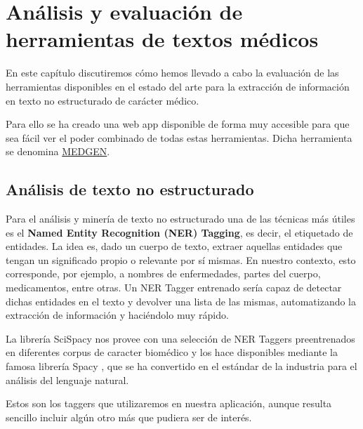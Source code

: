 \chapter{Análisis y evaluación de \\herramientas de textos médicos}

En este capítulo discutiremos cómo hemos llevado a cabo la evaluación de las herramientas disponibles en el estado del arte para la extracción de información en texto no estructurado de carácter médico.

Para ello se ha creado una web app disponible de forma muy accesible para que sea fácil ver el poder combinado de todas estas herramientas. Dicha herramienta se denomina \href{https://share.streamlit.io/jesi-rgb/medical-text-analysis/src/streamlit_gen_test.py}{MEDGEN}.

\section{Análisis de texto no estructurado}

Para el análisis y minería de texto no estructurado una de las técnicas más útiles es el \textbf{Named Entity Recognition (NER) Tagging}, es decir, el etiquetado de entidades. La idea es, dado un cuerpo de texto, extraer aquellas entidades que tengan un significado propio o relevante por sí mismas. En nuestro contexto, esto corresponde, por ejemplo, a nombres de enfermedades, partes del cuerpo, medicamentos, entre otras. Un NER Tagger entrenado sería capaz de detectar dichas entidades en el texto y devolver una lista de las mismas, automatizando la extracción de información y haciéndolo muy rápido.

La librería SciSpacy \cite{neumann-etal-2019-scispacy} nos provee con una selección de NER Taggers preentrenados en diferentes corpus de caracter biomédico y los hace disponibles mediante la famosa librería Spacy \cite{spacy}, que se ha convertido en el estándar de la industria para el análisis del lenguaje natural.

Estos son los taggers que utilizaremos en nuestra aplicación, aunque resulta sencillo incluir algún otro más que pudiera ser de interés.

